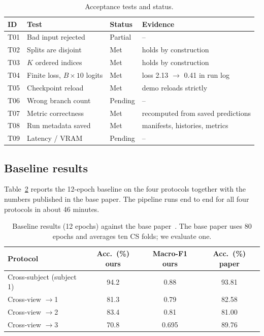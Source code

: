 \documentclass[runningheads]{llncs}
\begin{document}
\begin{table}[t]
\caption{Acceptance tests and status.}\label{tab:tests}
\centering
\small
\begin{tabular}{llll}
\toprule
ID & Test & Status & Evidence \\
\midrule
T01 & Bad input rejected & Partial & -- \\
T02 & Splits are disjoint & Met & holds by construction \\
T03 & $K$ ordered indices & Met & holds by construction \\
T04 & Finite loss, $B{\times}10$ logits & Met & loss 2.13 $\rightarrow$ 0.41 in run log \\
T05 & Checkpoint reload & Met & demo reloads strictly \\
T06 & Wrong branch count & Pending & -- \\
T07 & Metric correctness & Met & recomputed from saved predictions \\
T08 & Run metadata saved & Met & manifests, histories, metrics \\
T09 & Latency / VRAM & Pending & -- \\
\bottomrule
\end{tabular}
\end{table}

\subsection{Baseline results}
Table~\ref{tab:baseline} reports the 12-epoch baseline on the four protocols together with the numbers published in the base paper. The pipeline runs end to end for all four protocols in about 46 minutes.

\begin{table}[t]
\caption{Baseline results (12 epochs) against the base paper~\cite{bui2020}. The base paper uses 80 epochs and averages ten CS folds; we evaluate one.}\label{tab:baseline}
\centering
\small
\begin{tabular}{lccc}
\toprule
Protocol & Acc.\ (\%) ours & Macro-F1 ours & Acc.\ (\%) paper \\
\midrule
Cross-subject (subject 1) & 94.2 & 0.88 & 93.81 \\
Cross-view $\rightarrow$1 & 81.3 & 0.79 & 82.58 \\
Cross-view $\rightarrow$2 & 83.4 & 0.81 & 81.00 \\
Cross-view $\rightarrow$3 & 70.8 & 0.695 & 89.76 \\
\bottomrule
\end{tabular}
\end{table}
\end{document}
